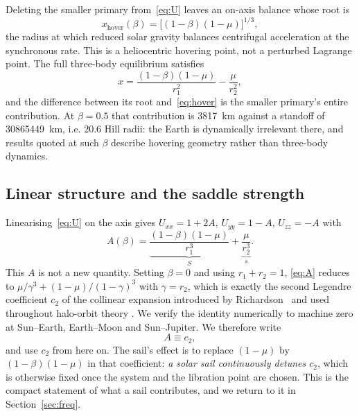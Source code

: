 \documentclass[11pt,a4paper]{article}
\begin{document}
Deleting the smaller primary from~\eqref{eq:U} leaves an on-axis balance whose
root is
\begin{equation}
  x_{\mathrm{hover}}(\beta) = \bigl[(1-\beta)(1-\mu)\bigr]^{1/3},
  \label{eq:hover}
\end{equation}
the radius at which reduced solar gravity balances centrifugal acceleration at
the synchronous rate. This is a heliocentric hovering point, not a perturbed
Lagrange point. The full three-body equilibrium satisfies
\begin{equation}
  x = \frac{(1-\beta)(1-\mu)}{r_1^{2}} - \frac{\mu}{r_2^{2}} ,
  \label{eq:balance}
\end{equation}
and the difference between its root and~\eqref{eq:hover} is the smaller
primary's entire contribution. At $\beta=0.5$ that contribution is
\SI{3817}{\kilo\metre} against a standoff of \SI{30865449}{\kilo\metre}, i.e.
$20.6$ Hill radii: the Earth is dynamically irrelevant there, and results quoted
at such $\beta$ describe hovering geometry rather than three-body dynamics.

\subsection{Linear structure and the saddle strength}

Linearising~\eqref{eq:U} on the axis gives
$U_{xx}=1+2A$, $U_{yy}=1-A$, $U_{zz}=-A$ with
\begin{equation}
  A(\beta) = \underbrace{\frac{(1-\beta)(1-\mu)}{r_1^{3}}}_{\textstyle S}
           + \underbrace{\frac{\mu}{r_2^{3}}}_{\textstyle s} .
  \label{eq:A}
\end{equation}
This $A$ is not a new quantity. Setting $\beta=0$ and using
$r_1+r_2=1$, \eqref{eq:A} reduces to
$\mu/\gamma^{3}+(1-\mu)/(1-\gamma)^{3}$ with $\gamma=r_2$, which is exactly the
second Legendre coefficient $c_2$ of the collinear expansion introduced by
Richardson~\cite{richardson1980} and used throughout halo-orbit theory
\cite{gomez2001,ceccaroni2016}. We verify the identity numerically to machine
zero at Sun--Earth, Earth--Moon and Sun--Jupiter. We therefore write
\begin{equation}
  A \equiv c_2 ,
  \label{eq:Ac2}
\end{equation}
and use $c_2$ from here on. The sail's effect is to replace $(1-\mu)$ by
$(1-\beta)(1-\mu)$ in that coefficient: \emph{a solar sail continuously detunes
$c_2$}, which is otherwise fixed once the system and the libration point are
chosen. This is the compact statement of what a sail contributes, and we return
to it in Section~\ref{sec:freq}.
\end{document}
